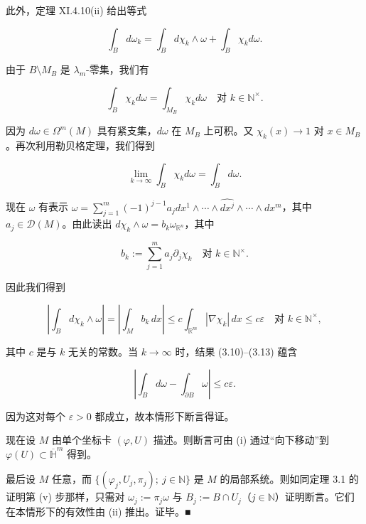 \begin{theorem}
\begin{subitems}
此外，定理 XI.4.10(ii) 给出等式

\begin{equation}
\int_B d\omega_k = \int_B d\chi_k\wedge\omega + \int_B \chi_k d\omega .\tag{3.12}
\end{equation}

由于 $ B\setminus M_B $ 是 $ \lambda_m $-零集，我们有

\[
\int_B \chi_k d\omega = \int_{M_B}\chi_k d\omega \quad \text{对 } k \in \mathbb{N}^\times .
\]

因为 $ d\omega \in \Omega^m(M) $ 具有紧支集，$ d\omega $ 在 $ M_B $ 上可积。又 $ \chi_k(x) \to 1 $ 对 $ x \in M_B $。再次利用勒贝格定理，我们得到

\begin{equation}
\lim_{k\to\infty}\int_B \chi_k d\omega = \int_B d\omega .\tag{3.13}
\end{equation}

现在 $ \omega $ 有表示 $ \omega = \sum_{j=1}^{m}(-1)^{j-1}a_j dx^1\wedge\cdots\wedge\widehat{dx^j}\wedge\cdots\wedge dx^m $，其中 $ a_j \in \mathcal{D}(M) $。由此读出 $ d\chi_k\wedge\omega = b_k\omega_{\mathbb{R}^n} $，其中

\[
b_k := \sum_{j=1}^{m}a_j\partial_j\chi_k \quad \text{对 } k \in \mathbb{N}^\times .
\]

因此我们得到

\[
\left|\int_B d\chi_k\wedge\omega\right| = \left|\int_M b_k\,dx\right| \le c\int_{\mathbb{R}^m}|\nabla\chi_k|\,dx \le c\varepsilon \quad \text{对 } k \in \mathbb{N}^\times ,
\]

其中 $ c $ 是与 $ k $ 无关的常数。当 $ k\to\infty $ 时，结果 (3.10)–(3.13) 蕴含

\[
\left|\int_B d\omega - \int_{\partial B}\omega\right| \le c\varepsilon .
\]

因为这对每个 $ \varepsilon > 0 $ 都成立，故本情形下断言得证。

\item

现在设 $ M $ 由单个坐标卡 $ (\varphi,U) $ 描述。则断言可由 (i) 通过“向下移动”到 $ \varphi(U) \subset \overline{\mathbb{H}}^m $ 得到。

\item

最后设 $ M $ 任意，而 $ \{(\varphi_j,U_j,\pi_j) ;\ j\in\mathbb{N}\} $ 是 $ M $ 的局部系统。则如同定理 3.1 的证明第 (v) 步那样，只需对 $ \omega_j := \pi_j\omega $ 与 $ B_j := B\cap U_j $（$ j \in \mathbb{N} $）证明断言。它们在本情形下的有效性由 (ii) 推出。证毕。\nobreak\hspace{0.35em}■

\end{subitems}

\end{theorem}

